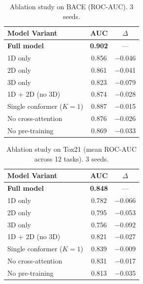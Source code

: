 \documentclass[11pt]{article}
\begin{document}
\begin{table}[t]
    \centering
    \caption{Ablation study on BACE (ROC-AUC). 3 seeds.}
    \label{tab:ablation_bace}
    \small
    \begin{tabular}{lcc}
        \toprule
        \textbf{Model Variant} & \textbf{AUC} & \textbf{$\Delta$} \\
        \midrule
        \textbf{Full model} & \textbf{0.902} & --- \\
        \midrule
        1D only & 0.856 & $-$0.046 \\
        2D only & 0.861 & $-$0.041 \\
        3D only & 0.823 & $-$0.079 \\
        1D + 2D (no 3D) & 0.874 & $-$0.028 \\
        Single conformer ($K\!=\!1$) & 0.887 & $-$0.015 \\
        No cross-attention & 0.876 & $-$0.026 \\
        No pre-training & 0.869 & $-$0.033 \\
        \bottomrule
    \end{tabular}
\end{table}

\begin{table}[t]
    \centering
    \caption{Ablation study on Tox21 (mean ROC-AUC across 12 tasks). 3 seeds.}
    \label{tab:ablation_tox21}
    \small
    \begin{tabular}{lcc}
        \toprule
        \textbf{Model Variant} & \textbf{AUC} & \textbf{$\Delta$} \\
        \midrule
        \textbf{Full model} & \textbf{0.848} & --- \\
        \midrule
        1D only & 0.782 & $-$0.066 \\
        2D only & 0.795 & $-$0.053 \\
        3D only & 0.756 & $-$0.092 \\
        1D + 2D (no 3D) & 0.821 & $-$0.027 \\
        Single conformer ($K\!=\!1$) & 0.839 & $-$0.009 \\
        No cross-attention & 0.831 & $-$0.017 \\
        No pre-training & 0.813 & $-$0.035 \\
        \bottomrule
    \end{tabular}
\end{table}
\end{document}
